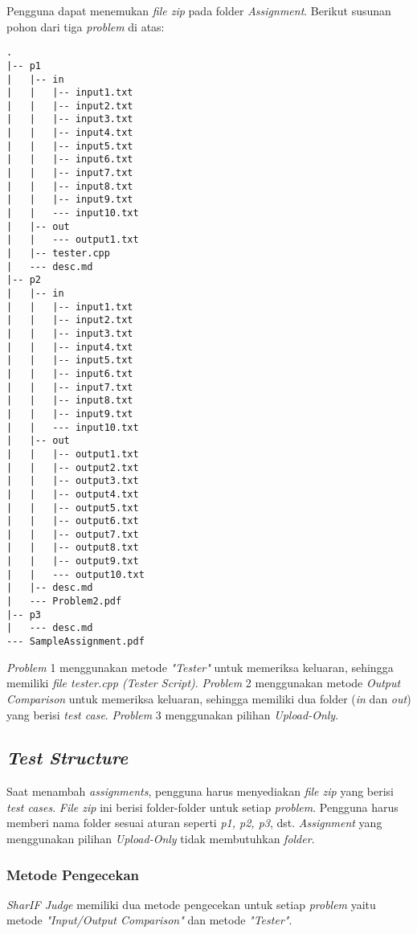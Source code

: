 Pengguna dapat menemukan \textit{file zip} pada folder \textit{Assignment}. Berikut susunan pohon dari tiga \textit{problem} di atas:

\begin{lstlisting}[basicstyle=\ttfamily, frame=single,
columns=fullflexible, keepspaces=true, breaklines=true, label=ls:8]
.
|-- p1
|   |-- in
|   |   |-- input1.txt
|   |   |-- input2.txt
|   |   |-- input3.txt
|   |   |-- input4.txt
|   |   |-- input5.txt
|   |   |-- input6.txt
|   |   |-- input7.txt
|   |   |-- input8.txt
|   |   |-- input9.txt
|   |   --- input10.txt
|   |-- out
|   |   --- output1.txt
|   |-- tester.cpp
|   --- desc.md
|-- p2
|   |-- in
|   |   |-- input1.txt
|   |   |-- input2.txt
|   |   |-- input3.txt
|   |   |-- input4.txt
|   |   |-- input5.txt
|   |   |-- input6.txt
|   |   |-- input7.txt
|   |   |-- input8.txt
|   |   |-- input9.txt
|   |   --- input10.txt
|   |-- out
|   |   |-- output1.txt
|   |   |-- output2.txt
|   |   |-- output3.txt
|   |   |-- output4.txt
|   |   |-- output5.txt
|   |   |-- output6.txt
|   |   |-- output7.txt
|   |   |-- output8.txt
|   |   |-- output9.txt
|   |   --- output10.txt
|   |-- desc.md
|   --- Problem2.pdf
|-- p3
|   --- desc.md
--- SampleAssignment.pdf
\end{lstlisting}

\textit{Problem} 1 menggunakan metode \textit{"Tester"} untuk memeriksa keluaran, sehingga memiliki \textit{file tester.cpp (Tester Script)}. \textit{Problem} 2 menggunakan metode \textit{Output Comparison} untuk memeriksa keluaran, sehingga memiliki dua folder (\textit{in} dan \textit{out}) yang berisi \textit{test case}. \textit{Problem} 3 menggunakan pilihan \textit{Upload-Only}.

\subsection{\textit{Test Structure}}
\label{subsec:test_structure}
Saat menambah \textit{assignments}, pengguna harus menyediakan \textit{file zip} yang berisi \textit{test cases}. \textit{File zip} ini berisi folder-folder untuk setiap \textit{problem}. Pengguna harus memberi nama folder sesuai aturan seperti \textit{p1, p2, p3}, dst. \textit{Assignment} yang menggunakan pilihan \textit{Upload-Only} tidak membutuhkan \textit{folder}.

\subsubsection{Metode Pengecekan}
\label{subsubsec:metode_pengecekan}
\textit{SharIF Judge} memiliki dua metode pengecekan untuk setiap \textit{problem} yaitu metode \textit{"Input/Output Comparison"} dan metode \textit{"Tester"}.

